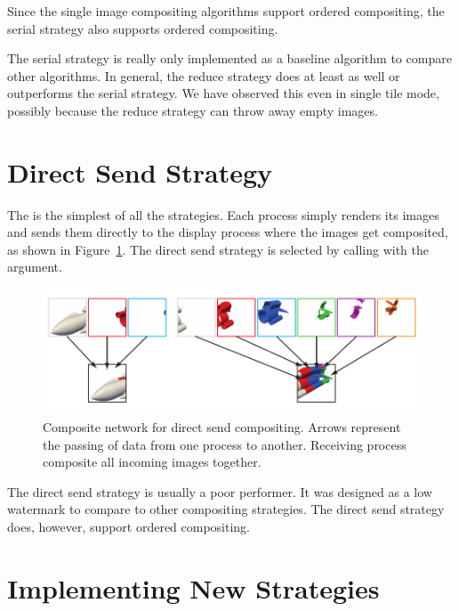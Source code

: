 Since the single image compositing algorithms support ordered
compositing, the serial strategy also supports ordered compositing.

The serial strategy is really only implemented as a baseline algorithm to
compare other algorithms.  In general, the reduce strategy does at least as
well or outperforms the serial strategy.  We have observed this even in
single tile mode, possibly because the reduce strategy can throw away empty
images.


\section{Direct Send Strategy}
\label{sec:Strategies:DirectSend}


The  is the simplest of all the strategies.
Each process simply renders its images and sends them directly to the
display process where the images get composited, as shown in
Figure~\ref{fig:DirectSend}.  The direct send strategy is selected by
calling  with the 
argument.

\begin{figure}
  \centering
  \includegraphics{images/DirectSend}
  \caption[Direct send compositing network.]{Composite network for direct
    send compositing.  Arrows represent the passing of data from one
    process to another.  Receiving process composite all incoming images
    together.}
  \label{fig:DirectSend}
\end{figure}

The direct send strategy is usually a poor performer.  It was designed as a
low watermark to compare to other compositing strategies.  The direct send
strategy does, however, support ordered compositing.


\section{Implementing New Strategies}

